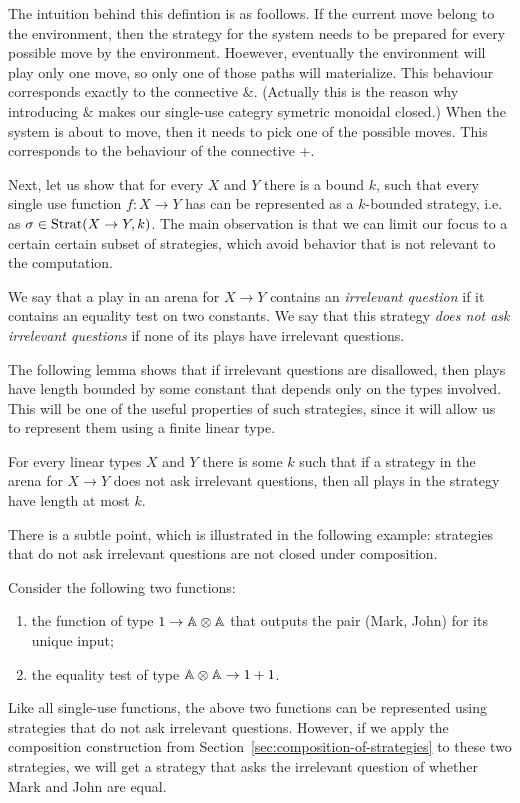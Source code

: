 The intuition behind this defintion is as foollows. If the current move belong to the environment, then the strategy 
for the system needs to be prepared for every possible move by the environment. Hoewever, eventually the environment 
will play only one move, so only one of those paths will materialize. This behaviour corresponds exactly to the connective $\&$. 
(Actually this is the reason why introducing $\&$ makes our single-use categry symetric monoidal closed.) 
When the system is about to move, then it needs to pick one of the possible moves. This corresponds to the behaviour of the connective $+$.


Next, let us show that for every $X$ and $Y$ there is a bound $k$, such that every single use function $f : X \to Y$ has can be represented 
as a $k$-bounded strategy, i.e. as $\sigma \in \text{Strat}(X \to Y, k)$. The main observation is that we can limit our focus to a certain 
certain subset of strategies, which avoid behavior that is not relevant to the computation.
\begin{definition} We say that a play in an arena for $X \to Y$ contains an \emph{irrelevant question} if it contains an equality test on two constants. We say that this strategy \emph{does not ask irrelevant questions} if none of its plays have irrelevant questions.
\end{definition}
  
The following lemma shows that if irrelevant questions are disallowed, then plays have length bounded by some constant that depends only on the types involved. This will be one of the useful properties of such strategies, since it will allow us to represent them using a finite linear type.
\begin{lemma}\label{lem:no-irrelevant-questions-are-bounded}
    For every linear types $X$ and $Y$ there is some $k$ such that if a strategy in the arena for $X \to Y$ does not ask irrelevant questions, then all plays in the strategy have length at most $k$.
\end{lemma}

There is a subtle point, which is illustrated in the following example:  strategies that do not ask irrelevant questions are not closed under composition. 

\begin{example}
    Consider the  following two functions: 
    \begin{enumerate}
        \item the function of type  $1 \to \mathbb A \otimes \mathbb A$ that outputs the pair (Mark, John) for its unique input;
        \item the equality test of type $\mathbb A \otimes \mathbb A \to 1 + 1$.
    \end{enumerate}
    Like all single-use functions, the above two functions can be represented using strategies that do not ask irrelevant questions. However, if we apply the composition construction from Section~\ref{sec:composition-of-strategies} to these two strategies, we will get a strategy that asks the irrelevant question of whether Mark and John are equal. \exampleend
\end{example}

